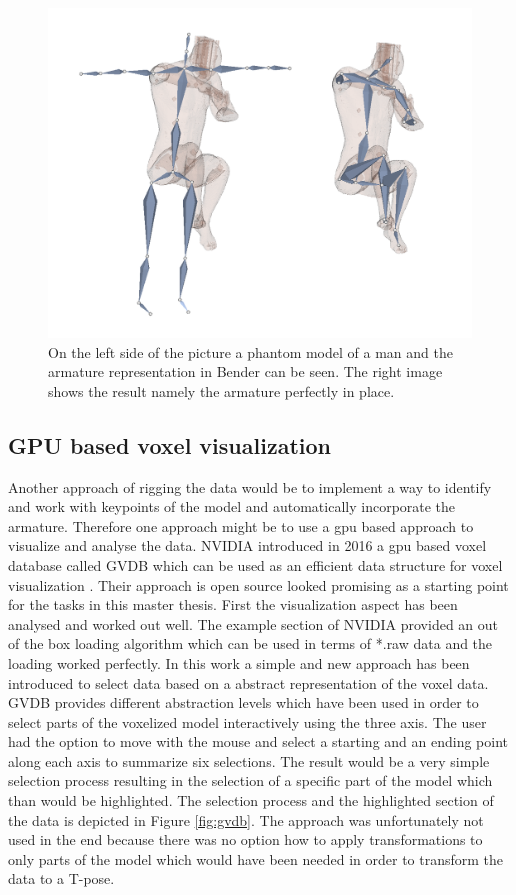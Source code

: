 \begin{figure} [!htb]
    \centering
	\includegraphics[width=12cm]{content/images/rigging}
	\caption{On the left side of the picture a phantom model of a man and the armature representation in Bender can be seen. The right image shows the result namely the armature perfectly in place.} 
	\label{fig:rigging}
\end{figure}

\newpage
\subsection{GPU based voxel visualization}

Another approach of rigging the data would be to implement a way to identify and work with keypoints of the model and automatically incorporate the armature. Therefore one approach might be to use a \gls{gpu} based approach to visualize and analyse the data. NVIDIA introduced in 2016 a \gls{gpu} based voxel database called GVDB which can be used as an efficient data structure for voxel visualization \cite{Hoetzlein2016}. Their approach is open source looked promising as a starting point for the tasks in this master thesis. First the visualization aspect has been analysed and worked out well. The example section of NVIDIA provided an out of the box loading algorithm which can be used in terms of *.raw data and the loading worked perfectly.\newline
In this work a simple and new approach has been introduced to select data based on a abstract representation of the voxel data. GVDB provides different abstraction levels which have been used in order to select parts of the voxelized model interactively using the three axis. The user had the option to move with the mouse and select a starting and an ending point along each axis to summarize six selections. The result would be a very simple selection process resulting in the selection of a specific part of the model which than would be highlighted. The selection process and the highlighted section of the data is depicted in Figure \ref{fig:gvdb}. The approach was unfortunately not used in the end because there was no option how to apply transformations to only parts of the model which would have been needed in order to transform the data to a T-pose.

